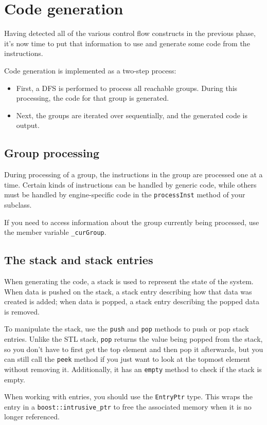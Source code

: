 \section{Code generation}
\label{sec:codegen}

Having detected all of the various control flow constructs in the previous phase, it's now time to put that information to use and generate some code from the instructions.

Code generation is implemented as a two-step process:
\begin{itemize}
\item First, a DFS is performed to process all reachable groups. During this processing, the code for that group is generated.
\item Next, the groups are iterated over sequentially, and the generated code is output.
\end{itemize}

\subsection{Group processing}
During processing of a group, the instructions in the group are processed one at a time. Certain kinds of instructions can be handled by generic code, while others must be handled by engine-specific code in the \verb+processInst+ method of your subclass.

If you need to access information about the group currently being processed, use the member variable \verb+_curGroup+.

\subsection{The stack and stack entries}
When generating the code, a stack is used to represent the state of the system. When data is pushed on the stack, a stack entry describing how that data was created is added; when data is popped, a stack entry describing the popped data is removed.

To manipulate the stack, use the \verb+push+ and \verb+pop+ methods to push or pop stack entries. Unlike the STL stack, \verb+pop+ returns the value being popped from the stack, so you don't have to first get the top element and then pop it afterwards, but you can still call the \verb+peek+ method if you just want to look at the topmost element without removing it. Additionally, it has an \verb+empty+ method to check if the stack is empty.

When working with entries, you should use the \verb+EntryPtr+ type. This wraps the entry in a \verb+boost::intrusive_ptr+ to free the associated memory when it is no longer referenced.

